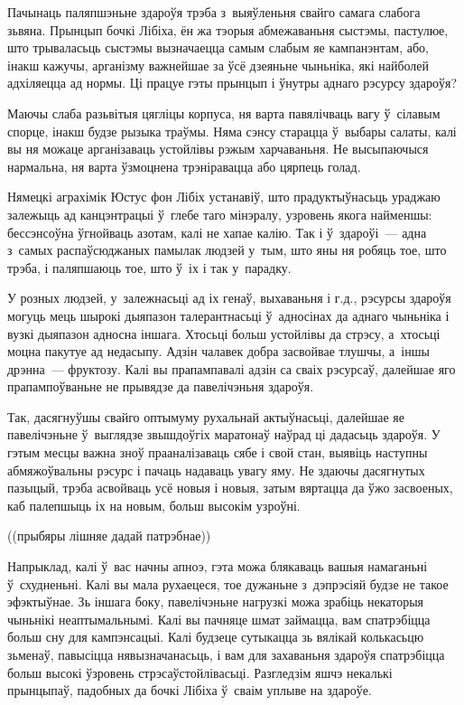 Пачынаць паляпшэньне здароўя трэба з~выяўленьня свайго самага слабога зьвяна. Прынцып бочкі Лібіха, ён жа тэорыя абмежаваньня сыстэмы, пастулюе, што трываласьць сыстэмы вызначаецца самым слабым яе кампанэнтам, або, інакш кажучы, арганізму важнейшае за ўсё дзеяньне чыньніка, які найболей адхіляецца ад нормы. Ці працуе гэты прынцып і ўнутры аднаго рэсурсу здароўя?

Маючы слаба разьвітыя цягліцы корпуса, ня варта павялічваць вагу ў~сілавым спорце, інакш будзе рызыка траўмы. Няма сэнсу старацца ў~выбары салаты, калі вы ня можаце арганізаваць устойлівы рэжым харчаваньня. Не высыпаючыся нармальна, ня варта ўзмоцнена трэніравацца або цярпець голад.

Нямецкі аграхімік Юстус фон Лібіх устанавіў, што прадуктыўнасьць ураджаю залежыць ад канцэнтрацыі ў~глебе таго мінэралу, узровень якога найменшы: бессэнсоўна ўгнойваць азотам, калі не хапае калію. Так і ў~здароўі~--- адна з~самых распаўсюджаных памылак людзей у~тым, што яны ня робяць тое, што трэба, і паляпшаюць тое, што ў~іх і так у~парадку.

У розных людзей, у~залежнасьці ад іх генаў, выхаваньня і г.д., рэсурсы здароўя могуць мець шырокі дыяпазон талерантнасьці ў~адносінах да аднаго чыньніка і вузкі дыяпазон адносна іншага. Хтосьці больш устойлівы да стрэсу, а~хтосьці моцна пакутуе ад недасыпу. Адзін чалавек добра засвойвае тлушчы, а~іншы дрэнна~--- фруктозу. Калі вы прапампавалі адзін са сваіх рэсурсаў, далейшае яго прапампоўваньне не прывядзе да павелічэньня здароўя.

Так, дасягнуўшы свайго оптымуму рухальнай актыўнасьці, далейшае яе павелічэньне ў~выглядзе звышдоўгіх маратонаў наўрад ці дадасьць здароўя. У гэтым месцы важна зноў прааналізаваць сябе і свой стан, выявіць наступны абмяжоўвальны рэсурс і пачаць надаваць увагу яму. Не здаючы дасягнутых пазыцый, трэба асвойваць усё новыя і новыя, затым вяртацца да ўжо засвоеных, каб палепшыць іх на новым, больш высокім узроўні.

((прыбяры лішняе дадай патрэбнае))

Напрыклад, калі ў~вас начны апноэ, гэта можа блякаваць вашыя намаганьні ў~схудненьні. Калі вы мала рухаецеся, тое дужаньне з~дэпрэсіяй будзе не такое эфэктыўнае. Зь іншага боку, павелічэньне нагрузкі можа зрабіць некаторыя чыньнікі неаптымальнымі. Калі вы пачняце шмат займацца, вам спатрэбіцца больш сну для кампэнсацыі. Калі будзеце сутыкацца зь вялікай колькасьцю зьменаў, павысіцца нявызначанасьць, і вам для захаваньня здароўя спатрэбіцца больш высокі ўзровень стрэсаўстойлівасьці. Разгледзім яшчэ некалькі прынцыпаў, падобных да бочкі Лібіха ў~сваім уплыве на здароўе.

